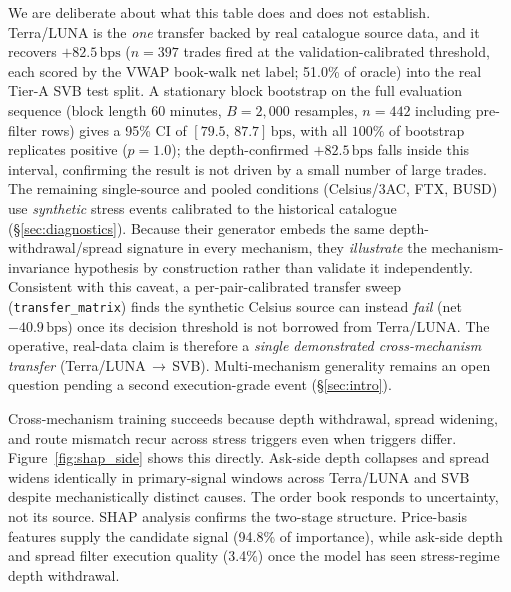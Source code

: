 \documentclass[sigconf,anonymous,natbib=false]{acmart}
\newcommand{\bps}{\,\text{bps}}
\begin{document}
We are deliberate about what this table does and does not establish.
Terra/LUNA is the \emph{one} transfer backed by real catalogue source data, and it
recovers $+82.5\bps$ ($n=397$ trades fired at the validation-calibrated threshold, each
scored by the VWAP book-walk net label; 51.0\% of oracle) into the real Tier-A SVB test split.
A stationary block bootstrap on the full evaluation sequence (block length 60 minutes,
$B{=}2{,}000$ resamples, $n=442$ including pre-filter rows) gives a 95\% CI of $[79.5,\,87.7]\bps$, with all $100\%$ of
bootstrap replicates positive ($p{=}1.0$); the depth-confirmed $+82.5\bps$ falls inside this interval, confirming the result is not driven by a
small number of large trades.
The remaining single-source and pooled conditions (Celsius/3AC, FTX, BUSD) use
\emph{synthetic} stress events calibrated to the historical catalogue
(\S\ref{sec:diagnostics}). Because their generator embeds the same
depth-withdrawal/spread signature in every mechanism, they \emph{illustrate} the
mechanism-invariance hypothesis by construction rather than validate it
independently. Consistent with this caveat, a per-pair-calibrated transfer sweep
(\texttt{transfer\_matrix}) finds the synthetic Celsius source can instead
\emph{fail} (net $-40.9\bps$) once its decision threshold is not borrowed from
Terra/LUNA. The operative, real-data claim is therefore a \emph{single demonstrated
cross-mechanism transfer} (Terra/LUNA$\,\to\,$SVB). Multi-mechanism generality
remains an open question pending a second execution-grade event (\S\ref{sec:intro}).

Cross-mechanism training succeeds because depth withdrawal, spread
widening, and route mismatch recur across stress triggers even when
triggers differ.
Figure~\ref{fig:shap_side} shows this directly. Ask-side depth
collapses and spread widens identically in primary-signal windows
across Terra/LUNA and SVB despite mechanistically distinct causes.
The order book responds to uncertainty, not its source.
SHAP analysis
confirms the two-stage structure. Price-basis features supply the
candidate signal (94.8\% of importance), while ask-side depth and
spread filter execution quality (3.4\%) once the model has seen
stress-regime depth withdrawal.
\end{document}
